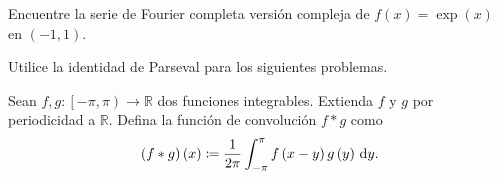 \question

Encuentre la serie de Fourier completa versión compleja de
\begin{math}
	f\left(x\right)=
	\exp\left(x\right)
\end{math}
en $\left(-1,1\right)$.

\question

Utilice la identidad de Parseval para los siguientes problemas.


\question

Sean $f,g\colon\left[-\pi,\pi\right)\to\mathbb{R}$ dos funciones
integrables.
Extienda $f$ y $g$ por periodicidad a $\mathbb{R}$.
Defina la función de convolución $f\ast g$ como
\begin{equation*}
	\left(f\ast g\right)
	\left(x\right)\coloneqq
	\frac{1}{2\pi}
	\int_{-\pi}^{\pi}
	f\left(x-y\right)
	g\left(y\right)
	\dl y.
\end{equation*}

